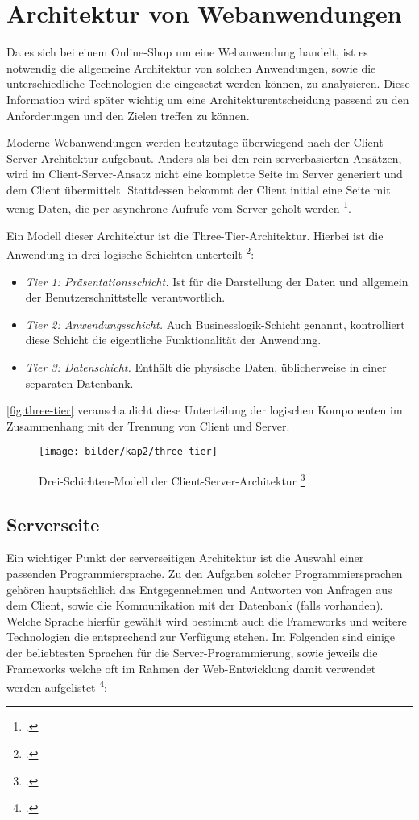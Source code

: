 \section{Architektur von Webanwendungen}\label{web_architecture} \thispagestyle{nomarkstyle}
Da es sich bei einem Online-Shop um eine Webanwendung handelt, ist es notwendig die allgemeine Architektur von solchen Anwendungen, sowie die unterschiedliche Technologien die eingesetzt werden können, zu analysieren. Diese Information wird später wichtig um eine  Architekturentscheidung passend zu den Anforderungen und den Zielen treffen zu können.

Moderne Webanwendungen werden heutzutage überwiegend nach der Client-Server-Architektur aufgebaut. Anders als bei den rein serverbasierten Ansätzen, wird im Client-Server-Ansatz nicht eine komplette Seite im Server generiert und dem Client übermittelt. Stattdessen bekommt der Client initial eine Seite mit wenig Daten, die per asynchrone Aufrufe vom Server geholt werden \footcite[Vgl.][S. 1-8]{Saternos2014}.

Ein Modell dieser Architektur ist die Three-Tier-Architektur. Hierbei ist die Anwendung in drei logische Schichten unterteilt \footcite[Vgl.][]{Techopedia2017}:
\begin{itemize}
	\item \textit{Tier 1: Präsentationsschicht.} Ist für die Darstellung der Daten und allgemein der Benutzerschnittstelle verantwortlich.
	\item \textit{Tier 2: Anwendungsschicht.} Auch Businesslogik-Schicht genannt, kontrolliert diese Schicht die eigentliche Funktionalität der Anwendung.
	\item \textit{Tier 3: Datenschicht.} Enthält die physische Daten, üblicherweise in einer separaten Datenbank.
\end{itemize}

\autoref{fig:three-tier} veranschaulicht diese Unterteilung der logischen Komponenten im Zusammenhang mit der Trennung von Client und Server. %

\begin{figure}[ht!]
	\centering
	\texttt{[image: bilder/kap2/three-tier]}
	\caption{Drei-Schichten-Modell der Client-Server-Architektur \footcite[Vgl.][]{Conallen2000}}
	\label{fig:three-tier}
\end{figure}

\subsection{Serverseite}
Ein wichtiger Punkt der serverseitigen Architektur ist die Auswahl einer passenden Programmiersprache. Zu den Aufgaben solcher Programmiersprachen gehören hauptsächlich das Entgegennehmen und Antworten von Anfragen aus dem Client, sowie die Kommunikation mit der Datenbank (falls vorhanden). Welche Sprache hierfür gewählt wird bestimmt auch die Frameworks und weitere Technologien die entsprechend zur Verfügung stehen. Im Folgenden sind einige der beliebtesten Sprachen für die Server-Programmierung, sowie jeweils die Frameworks welche oft im Rahmen der Web-Entwicklung damit verwendet werden aufgelistet \footcite[Vgl.][S. 9-12]{School2016}:

